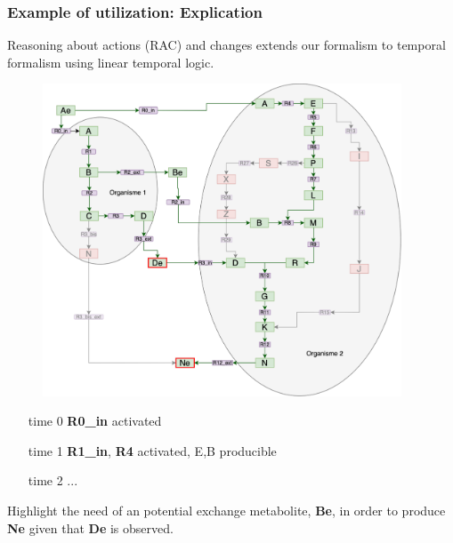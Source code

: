 \documentclass[8pt,usenames,dvipsnames]{beamer}
\begin{document}
\begin{frame}
\frametitle{Example of utilization: Explication}
Reasoning about actions (RAC) and changes extends our formalism to temporal formalism using linear temporal logic.
\begin{minipage}{0.7\textwidth}
\begin{figure}[H]
    \begin{center}
        \includegraphics[width=0.95\textwidth]{figures/Explication.pdf}
        \label{fig:explication}
    \end{center}
\end{figure}
\end{minipage}%
\hspace{0.2cm}
\hfill
\begin{minipage}{0.25\textwidth}
\begin{itemize}
\item[time 0] \textbf{R0\_in} activated
\item[time 1]\textbf{R1\_in}, \textbf{R4} activated, E,B producible
\item[time 2] ...
\end{itemize}
\end{minipage}

\vspace{-0.1cm}
\begin{alertblock}{}
Highlight the need of an potential exchange metabolite, \textbf{Be}, in order to produce \textbf{Ne} given that \textbf{De} is observed.
\end{alertblock}
    
    


\end{frame}
\end{document}
